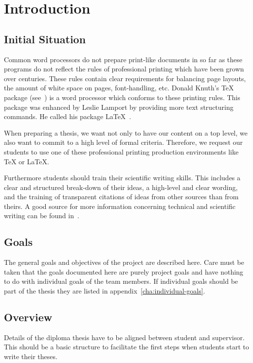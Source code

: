 \chapter{Introduction}
\section{Initial Situation}
Common word processors do not prepare print-like documents in so far as these programs do not reflect the rules of professional printing which have been grown over centuries. These rules contain clear requirements for balancing page layouts, the amount of white space on pages, font-handling, etc. Donald Knuth's TeX package (see~\cite{knuth_texbook_1984}) is a word processor which conforms to these printing rules. This package was enhanced by Leslie Lamport by providing more text structuring commands. He called his package LaTeX~\cite{lamport_latex_1985}.

When preparing a thesis, we want not only to have our content on a top level, we also want to commit to a high level of formal criteria. Therefore, we request our students to use one of these professional printing production environments like TeX or LaTeX.

Furthermore students should train their scientific writing skills. This includes a clear and structured break-down of their ideas, a high-level and clear wording, and the training of transparent citations of ideas from other sources than from theirs. A good source for more information concerning technical and scientific writing can be found in~\cite{rechenberg_technisches_2006}.

\section{Goals}
The general goals and objectives of the project are described here. Care must be taken that the goals documented here are purely project goals and have nothing to do with individual goals of the team members. If individual goals should be part of the thesis they are listed in appendix~\ref{cha:individual-goals}.

\section{Overview}
Details of the diploma thesis have to be aligned between student and supervisor. This should be a basic structure to facilitate the first steps when students start to write their theses.

